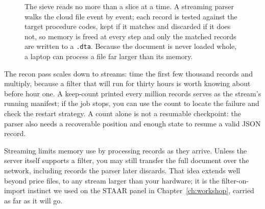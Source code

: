 \documentclass[
    a4paper,
    fontsize=10pt,
    twoside=true,
    numbers=noenddot,
]{kaobook}
\begin{document}
\begin{figure}[htbp]
\centering
{}
\caption[The streaming sieve]{The sieve reads no more than a slice at a time.
A streaming parser walks the cloud file event by event; each record is
tested against the target procedure codes, kept if it matches and
discarded if it does not, so memory is freed at every step and only the
matched records are written to a \texttt{.dta}. Because the document is
never loaded whole, a laptop can process a file far larger than its
memory.}
\label{fig:ch04-viz-sieve}
\end{figure}

The recon pass scales down to streams: time the first few thousand records and multiply, because a filter that will run for thirty hours is worth knowing about before hour one. A keep-count printed every million records serves as the stream's running manifest; if the job stops, you can use the count to locate the failure and check the restart strategy. A count alone is not a resumable checkpoint: the parser also needs a recoverable position and enough state to resume a valid JSON record.

Streaming limits memory use by processing records as they arrive. Unless the server itself supports a filter, you may still transfer the full document over the network, including records the parser later discards. That idea extends well beyond price files, to any stream larger than your hardware; it is the filter-on-import instinct we used on the STAAR panel in Chapter~\ref{ch:workshop}, carried as far as it will go.
\end{document}
